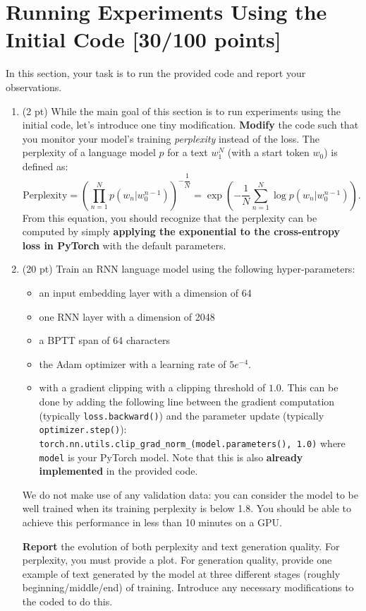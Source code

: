 \documentclass[a4paper,11pt]{article}
\begin{document}
\section{Running Experiments Using the Initial Code [30/100 points]}
\label{sec:2}
In this section, your task is to run the provided code and report your observations.
\begin{enumerate}
\item (2 pt) While the main goal of this section is to run experiments using the initial code, let's introduce one tiny modification. \textbf{Modify} the code such that you monitor your model's training \textit{perplexity} instead of the loss. 
The perplexity of a language model $p$ for a text $w_1^N$ (with a start token $w_0$) is defined as:
\[
\text{Perplexity} = (\prod_{n=1}^{N}p(w_{n} | w_{0}^{n-1}))^{-\dfrac{1}{N}} = \exp(\displaystyle -\dfrac{1}{N}\sum_{n=1}^{N}\log p(w_{n} | w_{0}^{n-1})).
\]
From this equation, you should recognize that the perplexity can be computed by
simply \textbf{applying the exponential to the cross-entropy loss in PyTorch} with the default parameters.

\item (20 pt) Train an RNN language model using the following hyper-parameters:
\begin{itemize}
\item an input embedding layer with a dimension of 64
\item one RNN layer with a dimension of 2048
\item a BPTT span of 64 characters
\item the Adam optimizer with a learning rate of $5e^{-4}$.
\item with a gradient clipping with a clipping threshold of $1.0$. This can be done by adding the following line between the gradient computation (typically \texttt{loss.backward()})
and the parameter update (typically \texttt{optimizer.step()}):\\
\texttt{torch.nn.utils.clip\_grad\_norm\_(model.parameters(), 1.0)} where \texttt{model} is your PyTorch model.
Note that this is also \textbf{already implemented} in the provided code.
\end{itemize}

We do not make use of any validation data: you can consider the model to be well trained when its training perplexity is below 1.8. You should be able to achieve this performance in less than 10 minutes on a GPU.

\textbf{Report} the evolution of both perplexity and text generation quality.
For perplexity, you must provide a plot. For generation quality, provide one example of text generated by the model at three different stages (roughly beginning/middle/end) of training. Introduce any necessary modifications to the coded to do this.


\end{enumerate}
\end{document}

